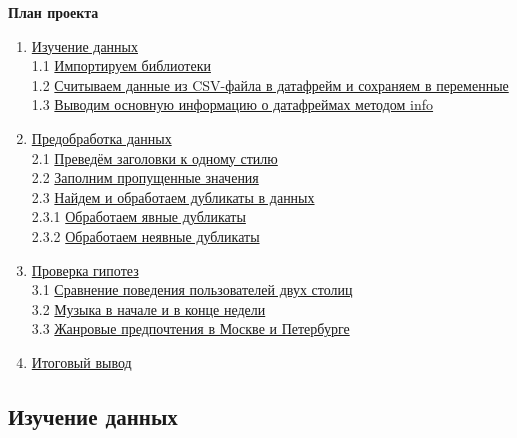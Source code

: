 \documentclass[11pt]{article}
\providecommand{\tightlist}{%
      \setlength{\itemsep}{0pt}\setlength{\parskip}{0pt}}
\begin{document}
    \textbf{План проекта}

\begin{enumerate}
\def\labelenumi{\arabic{enumi}.}
\tightlist
\item
  \hyperref[изучение-данных]{Изучение данных}\\
  1.1 \hyperref[импортируем-библиотеки]{Импортируем библиотеки}\\
  1.2
  \hyperref[считываем-данные-из-csv-файла-в-датафрейм-и-сохраняем-в-переменные]{Считываем данные из CSV-файла в датафрейм и сохраняем в переменные}\\
  1.3
  \hyperref[выводим-основную-информацию-о-датафреймах-методом-info]{Выводим основную информацию о датафреймах методом info}\\
\item
  \hyperref[предобработка-данных]{Предобработка данных}\\
  2.1
  \hyperref[преведём-заголовки-к-одному-стилю]{Преведём заголовки к одному стилю}\\
  2.2
  \hyperref[заполним-пропущенные-значения]{Заполним пропущенные значения}\\
  2.3
  \hyperref[найдем-и-обработаем-дубликаты-в-данных]{Найдем и обработаем дубликаты в данных}\\
  2.3.1
  \hyperref[обработаем-явные-дубликаты]{Обработаем явные дубликаты}\\
  2.3.2
  \hyperref[обработаем-неявные-дубликаты]{Обработаем неявные дубликаты}\\
\item
  \hyperref[проверка-гипотез]{Проверка гипотез}\\
  3.1
  \hyperref[сравнение-поведения-пользователей-двух-столиц]{Сравнение поведения пользователей двух столиц}\\
  3.2
  \hyperref[музыка-в-начале-и-в-конце-недели]{Музыка в начале и в конце недели}\\
  3.3
  \hyperref[жанровые-предпочтения-в-москве-и-петербурге]{Жанровые предпочтения в Москве и Петербурге}\\
\item
  \hyperref[итоговый-вывод]{Итоговый вывод}
\end{enumerate}

    \hypertarget{ux438ux437ux443ux447ux435ux43dux438ux435-ux434ux430ux43dux43dux44bux445}{%
\subsection{Изучение
данных}\label{ux438ux437ux443ux447ux435ux43dux438ux435-ux434ux430ux43dux43dux44bux445}}
\end{document}

